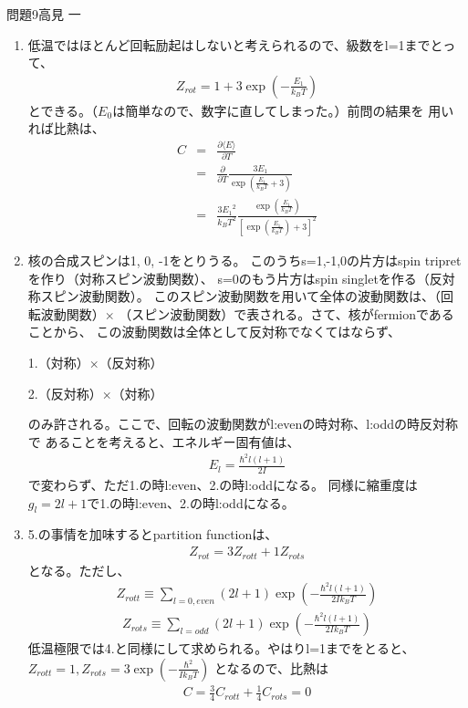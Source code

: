 \documentclass[fleqn]{jbook}
\begin{document}
\begin{answer}{問題9}{高見 一}
\begin{enumerate}
\item 低温ではほとんど回転励起はしないと考えられるので、級数をl=1までとって、
\begin{eqnarray*}
Z_{rot} = 1 + 3 \exp \left( -  \frac{E_1}{k_B T} \right)
\end{eqnarray*}
とできる。（$E_0$は簡単なので、数字に直してしまった。）前問の結果を
用いれば比熱は、
\begin{eqnarray*}
C &=& \frac{\partial \langle E\rangle}{\partial T} \\
&=& \frac{\partial}{\partial T}\frac{3 E_1}{\exp \left( \frac{E_1}{k_BT} + 3 
\right)} \\
&=& \frac{3 {E_1}^2}{k_B T^2}\frac{\exp \left(\frac{E_1}{k_BT} \right)}
{\left[ \exp \left( \frac{E_1}{k_BT} \right) + 3 \right]^2}
\end{eqnarray*}

\item 核の合成スピンは1, 0, -1をとりうる。
このうちs=1,-1,0の片方はspin tripretを作り（対称スピン波動関数）、
s=0のもう片方はspin singletを作る（反対称スピン波動関数）。
このスピン波動関数を用いて全体の波動関数は、（回転波動関数）$\times$
（スピン波動関数）で表される。さて、核がfermionであることから、
この波動関数は全体として反対称でなくてはならず、

  1.（対称）$\times$（反対称）
  
  2.（反対称）$\times$（対称）

のみ許される。ここで、回転の波動関数がl:evenの時対称、l:oddの時反対称で
あることを考えると、エネルギー固有値は、
\begin{eqnarray*}
E_l = \frac{\hbar^2 l(l+1)}{2 I}
\end{eqnarray*}で変わらず、ただ1.の時l:even、2.の時l:oddになる。
同様に縮重度は$g_l = 2l + 1$で1.の時l:even、2.の時l:oddになる。

\item 5.の事情を加味するとpartition functionは、
\begin{eqnarray*}
Z_{rot} = 3 Z_{rott} + 1 Z_{rots}
\end{eqnarray*}
となる。ただし、
\begin{eqnarray*}
Z_{rott} \equiv \sum_{l = 0,even} (2l + 1) \exp \left( - \frac{\hbar^2 l (l+1)}
{2Ik_BT}\right)
\end{eqnarray*}
\begin{eqnarray*}
Z_{rots} \equiv \sum_{l = odd} (2l + 1) \exp \left( - \frac{\hbar^2 l (l+1)}
{2Ik_BT}\right)
\end{eqnarray*}
低温極限では4.と同様にして求められる。やはりl=1までをとると、
$\displaystyle Z_{rott} = 1 , Z_{rots} = 3 \exp \left(-\frac{\hbar^2}{Ik_BT}
\right)$
となるので、比熱は
\begin{eqnarray*}
C = \frac{3}{4}C_{rott} + \frac{1}{4}C_{rots} = 0
\end{eqnarray*}



\end{enumerate}
\end{answer}
\end{document}
